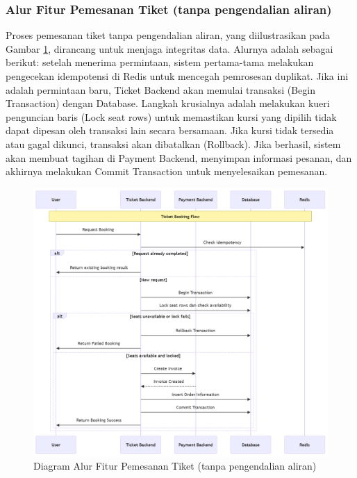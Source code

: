 \subsubsection{Alur Fitur Pemesanan Tiket (tanpa pengendalian aliran)}

Proses pemesanan tiket tanpa pengendalian aliran, yang diilustrasikan pada Gambar \ref{fig:flow-book-flow}, dirancang untuk menjaga integritas data. Alurnya adalah sebagai berikut: setelah menerima permintaan, sistem pertama-tama melakukan pengecekan idempotensi di Redis untuk mencegah pemrosesan duplikat. Jika ini adalah permintaan baru, Ticket Backend akan memulai transaksi (Begin Transaction) dengan Database. Langkah krusialnya adalah melakukan kueri penguncian baris (Lock seat rows) untuk memastikan kursi yang dipilih tidak dapat dipesan oleh transaksi lain secara bersamaan. Jika kursi tidak tersedia atau gagal dikunci, transaksi akan dibatalkan (Rollback). Jika berhasil, sistem akan membuat tagihan di Payment Backend, menyimpan informasi pesanan, dan akhirnya melakukan Commit Transaction untuk menyelesaikan pemesanan.

\begin{figure}[H]
    \centering
    \includegraphics[width=1\textwidth]{resources/chapter-3/book-flow.png}
    \caption{Diagram Alur Fitur Pemesanan Tiket (tanpa pengendalian aliran)}
    \label{fig:flow-book-flow}
\end{figure}

